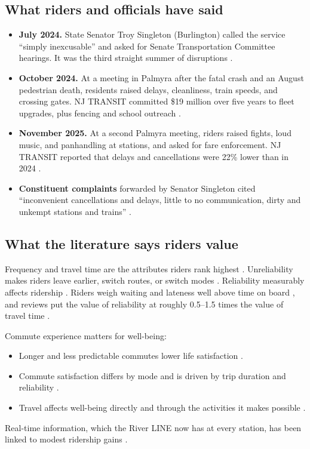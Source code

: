 \documentclass[11pt]{article}
\begin{document}
\subsection{What riders and officials have said}
\begin{itemize}
\item \textbf{July 2024.} State Senator Troy Singleton (Burlington) called the service ``simply inexcusable'' and asked for Senate Transportation Committee hearings. It was the third straight summer of disruptions \citep{insidernj2024}.
\item \textbf{October 2024.} At a meeting in Palmyra after the fatal crash and an August pedestrian death, residents raised delays, cleanliness, train speeds, and crossing gates. NJ TRANSIT committed \$19 million over five years to fleet upgrades, plus fencing and school outreach \citep{cbs2024meeting}.
\item \textbf{November 2025.} At a second Palmyra meeting, riders raised fights, loud music, and panhandling at stations, and asked for fare enforcement. NJ TRANSIT reported that delays and cancellations were 22\% lower than in 2024 \citep{centraljersey2025}.
\item \textbf{Constituent complaints} forwarded by Senator Singleton cited ``inconvenient cancellations and delays, little to no communication, dirty and unkempt stations and trains'' \citep{singleton2025}.
\end{itemize}

\subsection{What the literature says riders value}
Frequency and travel time are the attributes riders rank highest \citep{transitcenter2016}. Unreliability makes riders leave earlier, switch routes, or switch modes \citep{carrel2013}. Reliability measurably affects ridership \citep{chakrabarti2015}. Riders weigh waiting and lateness well above time on board \citep{wardman2004}, and reviews put the value of reliability at roughly 0.5--1.5 times the value of travel time \citep{carrion2012}.

Commute experience matters for well-being:
\begin{itemize}
\item Longer and less predictable commutes lower life satisfaction \citep{stutzer2008}.
\item Commute satisfaction differs by mode and is driven by trip duration and reliability \citep{stlouis2014}.
\item Travel affects well-being directly and through the activities it makes possible \citep{ettema2010,devos2013}.
\end{itemize}
Real-time information, which the River LINE now has at every station, has been linked to modest ridership gains \citep{brakewood2015}.
\end{document}
